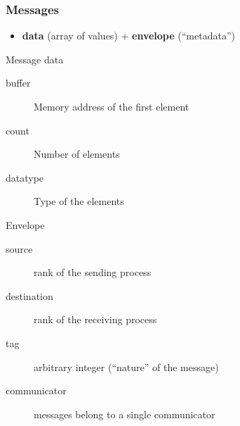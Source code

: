 \documentclass[xcolor={x11names,svgnames,psnames}]{beamer}
\begin{document}
\begin{frame}
  \frametitle{Messages}

  \begin{itemize}
  \item \textbf{data} (\alert{array} of values) + \textbf{envelope} (``metadata'')
  \end{itemize}
  
  \begin{alertblock}{Message data}
    \begin{description}
    \item[buffer]    Memory address of the first element
    \item[count]     Number of elements
    \item[datatype]  Type of the elements
    \end{description}
  \end{alertblock}

  \begin{block}{Envelope}
    \begin{description}
    \item[source]       rank of the sending process
    \item[destination]  rank of the receiving process
    \item[tag]          arbitrary integer (``nature'' of the message)
    \item[communicator] messages belong to a single communicator
    \end{description}
  \end{block}
\end{frame}

\end{document}
